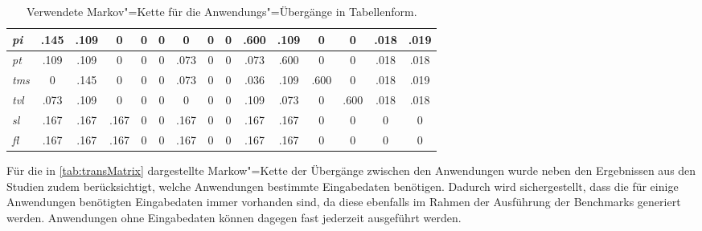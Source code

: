 \begin{table}
{\begin{tabular}{l|c|c|c|c|c|c|c|c|c|c|c|c|c|c}
    	\textit{pi}  &     .145     &     .109     &      0      &      0       &      0      &      0      &      0      &      0       &    .600     &    .109     &      0       &      0       &    .018     &    .019     \\ \hline
    	\textit{pt}  &     .109     &     .109     &      0      &      0       &      0      &    .073     &      0      &      0       &    .073     &    .600     &      0       &      0       &    .018     &    .018     \\ \hline
    	\textit{tms} &      0       &     .145     &      0      &      0       &      0      &    .073     &      0      &      0       &    .036     &    .109     &     .600     &      0       &    .018     &    .019     \\ \hline
    	\textit{tvl} &     .073     &     .109     &      0      &      0       &      0      &      0      &      0      &      0       &    .109     &    .073     &      0       &     .600     &    .018     &    .018     \\ \hline
    	\textit{sl}  &     .167     &     .167     &    .167     &      0       &      0      &    .167     &      0      &      0       &    .167     &    .167     &      0       &      0       &      0      &      0      \\ \hline
    	\textit{fl}  &     .167     &     .167     &    .167     &      0       &      0      &    .167     &      0      &      0       &    .167     &    .167     &      0       &      0       &      0      &      0
    \end{tabular}}
    \caption
    {Verwendete Markov"=Kette für die Anwendungs"=Übergänge in Tabellenform.}
    \label{tab:transMatrix}
\end{table}

Für die in \autoref{tab:transMatrix} dargestellte Markow"=Kette der Übergänge zwischen den Anwendungen wurde neben den Ergebnissen aus den Studien zudem berücksichtigt, welche Anwendungen bestimmte Eingabedaten benötigen.
Dadurch wird sichergestellt, dass die für einige Anwendungen benötigten Eingabedaten immer vorhanden sind, da diese ebenfalls im Rahmen der Ausführung der Benchmarks generiert werden.
Anwendungen ohne Eingabedaten können dagegen fast jederzeit ausgeführt werden.
